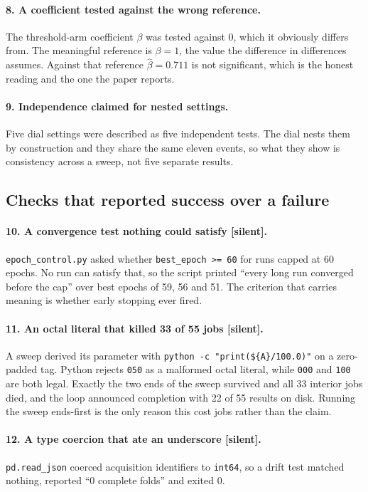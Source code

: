\documentclass[10pt,twocolumn,letterpaper]{article}
\begin{document}
\paragraph{8. A coefficient tested against the wrong reference.} The threshold-arm
coefficient $\beta$ was tested against $0$, which it obviously differs from. The
meaningful reference is $\beta = 1$, the value the difference in differences assumes.
Against that reference $\hat{\beta} = 0.711$ is not significant, which is the honest
reading and the one the paper reports.

\paragraph{9. Independence claimed for nested settings.} Five dial settings were
described as five independent tests. The dial nests them by construction and they
share the same eleven events, so what they show is consistency across a sweep, not
five separate results.

\subsection{Checks that reported success over a failure}

\paragraph{10. A convergence test nothing could satisfy \textbf{[silent]}.}
\texttt{epoch\_control.py} asked whether \texttt{best\_epoch >= 60} for runs capped at
60 epochs. No run can satisfy that, so the script printed ``every long run converged
before the cap'' over best epochs of 59, 56 and 51. The criterion that carries meaning
is whether early stopping ever fired.

\paragraph{11. An octal literal that killed 33 of 55 jobs \textbf{[silent]}.} A sweep
derived its parameter with \texttt{python -c "print(\$\{A\}/100.0)"} on a zero-padded
tag. Python rejects \texttt{050} as a malformed octal literal, while \texttt{000} and
\texttt{100} are both legal. Exactly the two ends of the sweep survived and all 33
interior jobs died, and the loop announced completion with 22 of 55 results on disk.
Running the sweep ends-first is the only reason this cost jobs rather than the claim.

\paragraph{12. A type coercion that ate an underscore \textbf{[silent]}.}
\texttt{pd.read\_json} coerced acquisition identifiers to \texttt{int64}, so a drift
test matched nothing, reported ``0 complete folds'' and exited 0.
\end{document}
